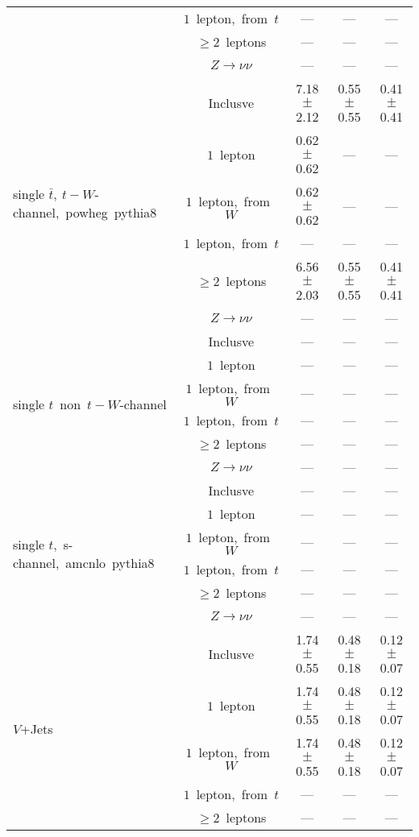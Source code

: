 \documentclass{article}
\begin{document}
\begin{longtable}{|l|c|c|c|c|}
 & $1$~lepton,~from~$t$  & ---  & ---  & --- \\* 
 & $\ge2$~leptons  & ---  & ---  & --- \\* 
 & $Z\rightarrow\nu\nu$  & ---  & ---  & --- \\* 
\hline 
\multirow{6}{*}{single $\bar{t},~t-W$-channel,~powheg~pythia8} & Inclusve  & 7.18 $\pm$ 2.12  & 0.55 $\pm$ 0.55  & 0.41 $\pm$ 0.41 \\* 
 & $1$~lepton  & 0.62 $\pm$ 0.62  & ---  & --- \\* 
 & $1$~lepton,~from~$W$  & 0.62 $\pm$ 0.62  & ---  & --- \\* 
 & $1$~lepton,~from~$t$  & ---  & ---  & --- \\* 
 & $\ge2$~leptons  & 6.56 $\pm$ 2.03  & 0.55 $\pm$ 0.55  & 0.41 $\pm$ 0.41 \\* 
 & $Z\rightarrow\nu\nu$  & ---  & ---  & --- \\* 
\hline 
\multirow{6}{*}{single $t$~non~$t-W$-channel} & Inclusve  & ---  & ---  & --- \\* 
 & $1$~lepton  & ---  & ---  & --- \\* 
 & $1$~lepton,~from~$W$  & ---  & ---  & --- \\* 
 & $1$~lepton,~from~$t$  & ---  & ---  & --- \\* 
 & $\ge2$~leptons  & ---  & ---  & --- \\* 
 & $Z\rightarrow\nu\nu$  & ---  & ---  & --- \\* 
\hline 
\multirow{6}{*}{single $t$,~s-channel,~amcnlo~pythia8} & Inclusve  & ---  & ---  & --- \\* 
 & $1$~lepton  & ---  & ---  & --- \\* 
 & $1$~lepton,~from~$W$  & ---  & ---  & --- \\* 
 & $1$~lepton,~from~$t$  & ---  & ---  & --- \\* 
 & $\ge2$~leptons  & ---  & ---  & --- \\* 
 & $Z\rightarrow\nu\nu$  & ---  & ---  & --- \\* 
\hline 
\multirow{6}{*}{$V$+Jets} & Inclusve  & 1.74 $\pm$ 0.55  & 0.48 $\pm$ 0.18  & 0.12 $\pm$ 0.07 \\* 
 & $1$~lepton  & 1.74 $\pm$ 0.55  & 0.48 $\pm$ 0.18  & 0.12 $\pm$ 0.07 \\* 
 & $1$~lepton,~from~$W$  & 1.74 $\pm$ 0.55  & 0.48 $\pm$ 0.18  & 0.12 $\pm$ 0.07 \\* 
 & $1$~lepton,~from~$t$  & ---  & ---  & --- \\* 
 & $\ge2$~leptons  & ---  & ---  & --- \\* 

\end{longtable}
\end{document}
